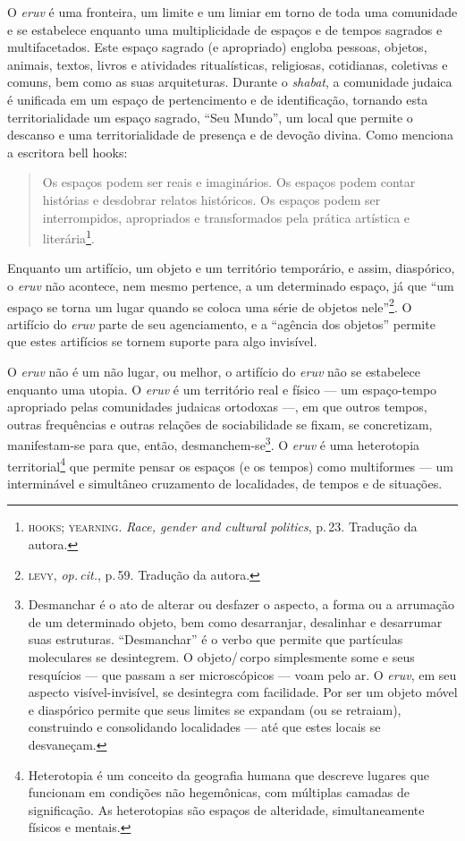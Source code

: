 \begin{center}\end{center}

\noindent{}O \emph{eruv} é uma fronteira, um limite e um limiar em torno de toda
uma comunidade e se estabelece enquanto uma multiplicidade de espaços e
de tempos sagrados e multifacetados. Este espaço sagrado (e apropriado)
engloba pessoas, objetos, animais, textos, livros e atividades
ritualísticas, religiosas, cotidianas, coletivas e comuns, bem como as
suas arquiteturas. Durante o \emph{shabat}, a comunidade judaica é
unificada em um espaço de pertencimento e de identificação, tornando
esta territorialidade um espaço sagrado, ``Seu Mundo'', um local
que permite o descanso e uma territorialidade
de presença e de devoção divina. Como menciona a escritora bell hooks:

\begin{quote}
Os espaços podem ser reais e imaginários. Os espaços podem contar
histórias e desdobrar relatos históricos. Os espaços podem ser
interrompidos, apropriados e transformados pela prática artística e
literária\footnote{\textsc{hooks}; \textsc{yearning}. \emph{Race, gender and cultural
  politics}, p.\,23. Tradução da autora.}.
\end{quote}

Enquanto um artifício, um objeto e um território temporário, e assim,
diaspórico, o \emph{eruv} não acontece, nem mesmo pertence, a um
determinado espaço, já que ``um espaço se torna um lugar quando se
coloca uma série de objetos nele''\footnote{\textsc{levy}, \emph{op.\,cit.}, p.\,59. Tradução da autora.}. O artifício do \emph{eruv} parte de seu
agenciamento, e a ``agência dos objetos'' permite que estes artifícios
se tornem suporte para algo invisível.

O \emph{eruv} não é um não lugar, ou melhor, o artifício do \emph{eruv}
não se estabelece enquanto uma utopia. O \emph{eruv} é um território
real e físico --- um espaço-tempo apropriado pelas comunidades judaicas
ortodoxas ---, em que outros tempos, outras frequências e outras
relações de sociabilidade se fixam, se concretizam, manifestam-se para
que, então, desmanchem-se\footnote{Desmanchar é o ato de alterar ou
  desfazer o aspecto, a forma ou a arrumação de um determinado objeto,
  bem como desarranjar, desalinhar e desarrumar suas estruturas.
  ``Desmanchar'' é o verbo que permite que partículas moleculares se
  desintegrem. O objeto/\,corpo simplesmente some e seus resquícios ---
  que passam a ser microscópicos --- voam pelo ar. O \emph{eruv}, em seu
  aspecto visível-invisível, se desintegra com facilidade. Por ser um
  objeto móvel e diaspórico permite que seus limites se expandam (ou se
  retraiam), construindo e consolidando localidades --- até que estes
  locais se desvaneçam.}. O \emph{eruv} é uma heterotopia
territorial\footnote{Heterotopia é um conceito da geografia humana que
  descreve lugares que funcionam em condições não hegemônicas, com
  múltiplas camadas de significação. As heterotopias são espaços de
  alteridade, simultaneamente físicos e mentais.} que permite pensar os
espaços (e os tempos) como multiformes --- um interminável e simultâneo
cruzamento de localidades, de tempos e de situações.

